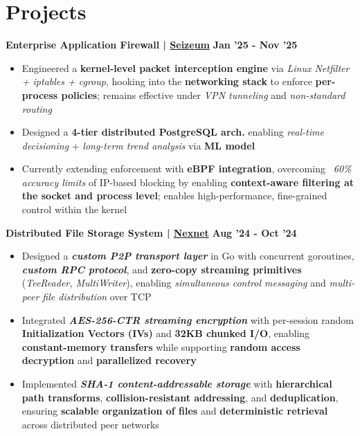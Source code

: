 \documentclass[11pt,a4paper]{article}
\newcommand{\project}[3]{
  \textbf{#1 | #2} \hfill \textbf{#3}
}
\begin{document}
\section*{Projects}

\project{Enterprise Application Firewall}{\href{https://github.com/Seizeum/Netra-Linux}{Seizeum}}{Jan '25 - Nov '25}
{\footnotesize
\begin{itemize}
    \item Engineered a \textbf{kernel-level packet interception engine} via \textit{Linux Netfilter + iptables + cgroup}, hooking into the \textbf{networking stack} to enforce \textbf{per-process policies}; remains effective under \textit{VPN tunneling} and \textit{non-standard routing}

    \item Designed a \textbf{4-tier distributed PostgreSQL arch.} enabling \textit{real-time decisioning} + \textit{long-term trend analysis} via \textbf{ML model}


    \item Currently extending enforcement with \textbf{eBPF integration}, overcoming \textit{~60\% accuracy limits} of IP-based blocking by enabling \textbf{context-aware filtering at the socket and process level}; enables high-performance, fine-grained control within the kernel

\end{itemize}
}

\project{Distributed File Storage System}{\href{https://github.com/PsychoPunkSage/NexNet}{Nexnet}}{Aug '24 - Oct '24}
{\footnotesize
\begin{itemize}
    \item Designed a \textbf{\textit{custom P2P transport layer}} in Go with concurrent goroutines, \textbf{\textit{custom RPC protocol}}, and \textbf{zero-copy streaming primitives} (\textit{TeeReader, MultiWriter}), enabling \textit{simultaneous control messaging} and \textit{multi-peer file distribution} over TCP

    \item Integrated \textbf{\textit{AES-256-CTR streaming encryption}} with per-session random \textbf{Initialization Vectors (IVs)} and \textbf{32KB chunked I/O}, enabling \textbf{constant-memory transfers} while supporting \textbf{random access decryption} and \textbf{parallelized recovery}

    \item Implemented \textbf{\textit{SHA-1 content-addressable storage}} with \textbf{hierarchical path transforms}, \textbf{collision-resistant addressing}, and \textbf{deduplication}, ensuring \textbf{scalable organization of files} and \textbf{deterministic retrieval} across distributed peer networks

\end{itemize}
}
\end{document}

